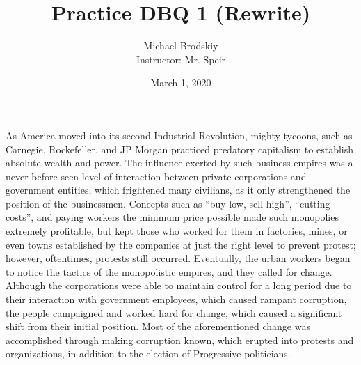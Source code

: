 \documentclass[12pt]{article}
\title{Practice DBQ 1 (Rewrite)}
\date{March 1, 2020}
\author{Michael Brodskiy\\ \small Instructor: Mr. Speir}
\begin{document}
\maketitle

\paragraph{} As America moved into its second Industrial Revolution, mighty tycoons, such as Carnegie, Rockefeller, and JP Morgan practiced predatory capitalism to establish absolute wealth and power. The influence exerted by such business empires was a never before seen level of interaction between private corporations and government entities, which frightened many civilians, as it only strengthened the position of the businessmen. Concepts such as ``buy low, sell high'', ``cutting costs'', and paying workers the minimum price possible made such monopolies extremely profitable, but kept those who worked for them in factories, mines, or even towns established by the companies at just the right level to prevent protest; however, oftentimes, protests still occurred. Eventually, the urban workers began to notice the tactics of the monopolistic empires, and they called for change. Although the corporations were able to maintain control for a long period due to their interaction with government employees, which caused rampant corruption, the people campaigned and worked hard for change, which caused a significant shift from their initial position. Most of the aforementioned change was accomplished through making corruption known, which erupted into protests and organizations, in addition to the election of Progressive politicians.
\end{document}
